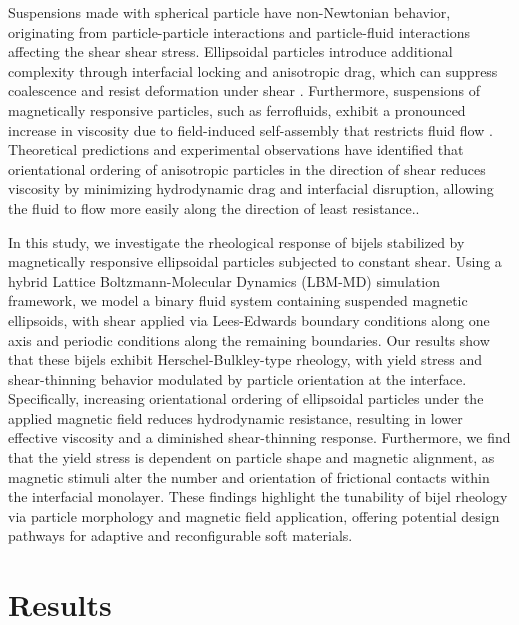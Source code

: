 Suspensions made with spherical particle have non-Newtonian behavior, originating from particle-particle interactions and particle-fluid interactions
affecting the shear shear stress. \cite{xu_relation_2013}
Ellipsoidal particles introduce additional complexity through interfacial locking and anisotropic drag, 
which can suppress coalescence and resist deformation under shear \cite{madivala_self-assembly_2009, daware_emulsions_2015, sun_assembly_2013}. Furthermore, suspensions of magnetically responsive particles, 
such as ferrofluids, exhibit a pronounced increase in viscosity due to field-induced self-assembly that restricts fluid flow \cite{qiao_magnetorheological_2012}. 
Theoretical predictions and experimental observations have identified that orientational ordering of anisotropic particles in the direction of shear reduces viscosity by minimizing hydrodynamic drag and interfacial 
disruption, allowing the fluid to flow more easily along the direction of least resistance.\cite{vermant_flow-induced_2005, xu_relation_2013}. 

In this study, we investigate the rheological response of bijels stabilized by magnetically responsive ellipsoidal particles subjected to constant shear. Using a hybrid Lattice Boltzmann-Molecular Dynamics 
(LBM-MD) simulation framework, we model a binary fluid system containing suspended magnetic ellipsoids, with shear applied via Lees-Edwards boundary conditions along one axis and periodic conditions along 
the remaining boundaries. Our results show that these bijels exhibit Herschel-Bulkley-type rheology, with yield stress and shear-thinning behavior modulated by particle orientation at the interface. 
Specifically, increasing orientational ordering of ellipsoidal particles under the applied magnetic field reduces hydrodynamic resistance, resulting in lower effective viscosity and a diminished shear-thinning 
response. Furthermore, we find that the yield stress is dependent on particle shape and magnetic alignment, as magnetic stimuli alter the number and orientation of frictional contacts within the interfacial 
monolayer. These findings highlight the tunability of bijel rheology via particle morphology and magnetic field application, offering potential design pathways for adaptive and reconfigurable soft materials.


\section{Results}\label{sec:results_p3}

